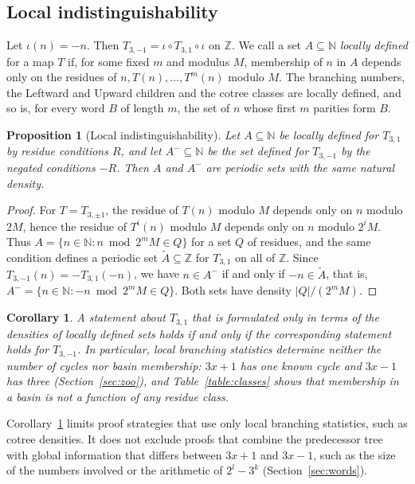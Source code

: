 \documentclass[12pt]{amsart}
\newtheorem{corollary}{Corollary}
\newtheorem{proposition}{Proposition}
\theoremstyle{definition}
\theoremstyle{remark}
\newcommand{\N}{\mathbb{N}}
\newcommand{\Z}{\mathbb{Z}}
\begin{document}
\subsection*{Local indistinguishability}
Let $\iota(n)=-n$. Then $T_{3,-1}=\iota\circ T_{3,1}\circ\iota$ on $\Z$. We call a set $A\subseteq\N$ \emph{locally defined} for a map $T$ if, for some fixed $m$ and modulus $M$, membership of $n$ in $A$ depends only on the residues of $n,T(n),\ldots,T^m(n)$ modulo $M$. The branching numbers, the Leftward and Upward children and the cotree classes are locally defined, and so is, for every word $B$ of length $m$, the set of $n$ whose first $m$ parities form $B$.

\begin{proposition}[Local indistinguishability]
\label{prop:local}
Let $A\subseteq\N$ be locally defined for $T_{3,1}$ by residue conditions $R$, and let $A^-\subseteq\N$ be the set defined for $T_{3,-1}$ by the negated conditions $-R$. Then $A$ and $A^-$ are periodic sets with the same natural density.
\end{proposition}

\begin{proof}
For $T=T_{3,\pm1}$, the residue of $T(n)$ modulo $M$ depends only on $n$ modulo $2M$, hence the residue of $T^i(n)$ modulo $M$ depends only on $n$ modulo $2^iM$. Thus $A=\{n\in\N: n\bmod 2^mM\in Q\}$ for a set $Q$ of residues, and the same condition defines a periodic set $\tilde A\subseteq\Z$ for $T_{3,1}$ on all of $\Z$. Since $T_{3,-1}(n)=-T_{3,1}(-n)$, we have $n\in A^-$ if and only if $-n\in\tilde A$, that is, $A^-=\{n\in\N:-n\bmod 2^mM\in Q\}$. Both sets have density $|Q|/(2^mM)$.
\end{proof}

\begin{corollary}
\label{cor:local}
A statement about $T_{3,1}$ that is formulated only in terms of the densities of locally defined sets holds if and only if the corresponding statement holds for $T_{3,-1}$. In particular, local branching statistics determine neither the number of cycles nor basin membership: $3x+1$ has one known cycle and $3x-1$ has three (Section~\ref{sec:zoo}), and Table~\ref{table:classes} shows that membership in a basin is not a function of any residue class.
\end{corollary}

Corollary~\ref{cor:local} limits proof strategies that use only local branching statistics, such as cotree densities. It does not exclude proofs that combine the predecessor tree with global information that differs between $3x+1$ and $3x-1$, such as the size of the numbers involved or the arithmetic of $2^l-3^k$ (Section~\ref{sec:words}).
\end{document}
